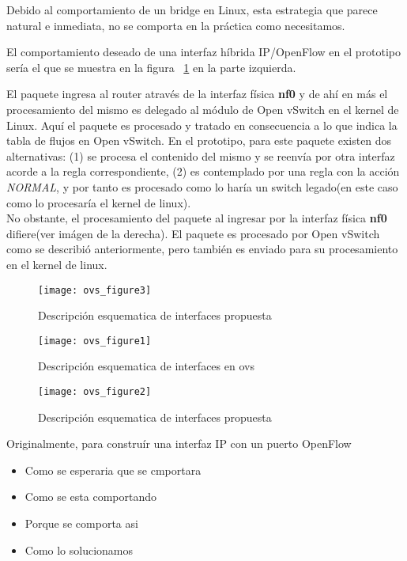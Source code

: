 \begin{enumerate}
Debido al comportamiento de un bridge en Linux, esta estrategia que parece natural e inmediata, no se comporta en la pr\'actica como necesitamos. 

El comportamiento deseado de una interfaz h\'ibrida IP/OpenFlow en el prototipo ser\'ia el que se muestra en la figura ~\ref{fig:OVSInterfaces} en la parte izquierda.

El paquete ingresa al router atrav\'es de la interfaz f\'isica \textbf{nf0} y de ah\'i en m\'as el procesamiento del mismo es delegado al m\'odulo de Open vSwitch en el kernel de Linux. Aqu\'i el paquete es procesado y tratado en consecuencia a lo que indica la tabla de flujos en Open vSwitch. En el prototipo, para este paquete existen dos alternativas: (1) se procesa el contenido del mismo y se reenv\'ia por otra interfaz acorde a la regla correspondiente, (2) es contemplado por una regla con la acci\'on \textit{NORMAL}, y por tanto es procesado como lo har\'ia un switch legado(en este caso como lo procesar\'ia el kernel de linux).\\

No obstante, el procesamiento del paquete al ingresar por la interfaz f\'isica \textbf{nf0} difiere(ver im\'agen de la derecha). El paquete es procesado por Open vSwitch como se describi\'o anteriormente, pero tambi\'en es enviado para su procesamiento en el kernel de linux.

\begin{figure}[htbp!] 
\centering    
\texttt{[image: ovs\_figure3]}
\caption[OVSInterfaces]{Descripci\'on esquematica de interfaces propuesta}
\label{fig:OVSInterfaces}
\end{figure}


\newpage
\begin{figure}[htbp!] 
\centering    
\texttt{[image: ovs\_figure1]}
\caption[OVSInterfaces1]{Descripci\'on esquematica de interfaces en ovs}
\label{fig:OVSInterfaces1}
\end{figure}

\begin{figure}[htbp!] 
\centering    
\texttt{[image: ovs\_figure2]}
\caption[OVSInterfaces2]{Descripci\'on esquematica de interfaces propuesta}
\label{fig:OVSInterfaces2}
\end{figure}


Originalmente, para constru\'ir una interfaz IP con un puerto OpenFlow 

\begin{itemize}
\item Como se esperaria que se cmportara
\item Como se esta comportando
\item Porque se comporta asi
\item Como lo solucionamos
\end{itemize}

\end{enumerate}

